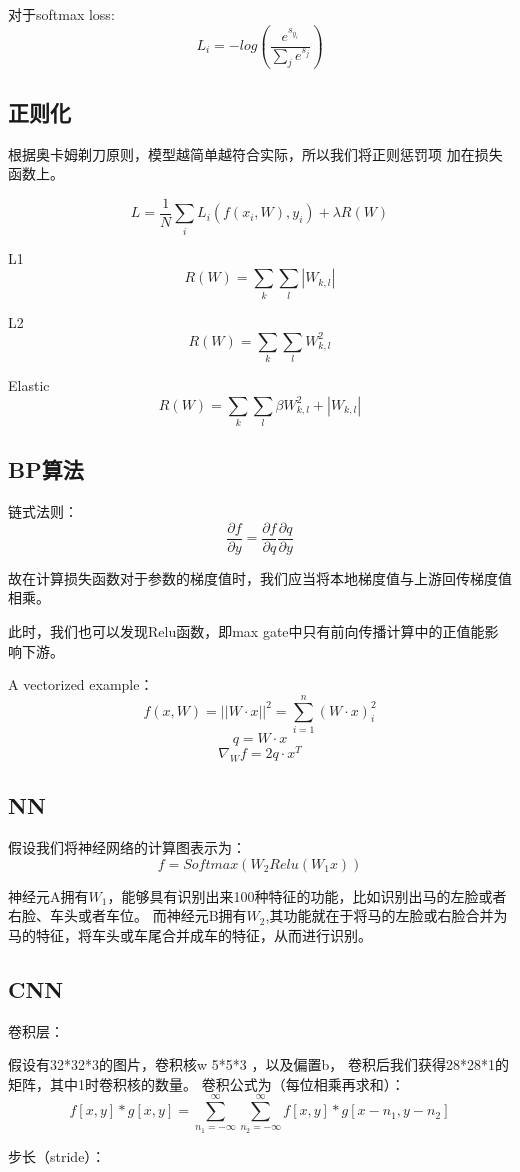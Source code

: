 \documentclass[a4paper]{article}
\begin{document}
对于softmax loss:
$$L_i = -log (\frac{e^{s_{y_i}}}{\sum_j e^{s_{j}}})$$

\subsection{正则化}

根据奥卡姆剃刀原则，模型越简单越符合实际，所以我们将正则惩罚项
加在损失函数上。

$$L =\frac{1}{N} \sum_i L_i(f(x_i,W),y_i)+λ R(W)$$

L1
$$R(W)=\sum_k \sum_l |W_{k,l}|$$

L2
$$R(W)=\sum_k \sum_l W_{k,l}^2$$

Elastic
$$R(W)=\sum_k \sum_l \beta W_{k,l}^2+|W_{k,l}|$$
\subsection{BP算法}
链式法则：
$$\frac{\partial f}{\partial y}=\frac{\partial f}{\partial q}\frac{\partial q}{\partial y}$$

故在计算损失函数对于参数的梯度值时，我们应当将本地梯度值与上游回传梯度值相乘。

此时，我们也可以发现Relu函数，即max gate中只有前向传播计算中的正值能影响下游。

A vectorized example：
$$f(x,W) =||W ⋅ x||^2 = \sum_{i=1}^n(W ⋅ x)_i^2$$
$$q = W \cdot x$$
$$\nabla_W f = 2q \cdot x^T$$


\subsection{NN}
假设我们将神经网络的计算图表示为：
$$f = Softmax(W_2 Relu(W_1 x))$$

神经元A拥有$W_1$，能够具有识别出来100种特征的功能，比如识别出马的左脸或者右脸、车头或者车位。
而神经元B拥有$W_2$,其功能就在于将马的左脸或右脸合并为马的特征，将车头或车尾合并成车的特征，从而进行识别。

\subsection{CNN}

卷积层：

假设有32*32*3的图片，卷积核w 5*5*3 ，以及偏置b，
卷积后我们获得28*28*1的矩阵，其中1时卷积核的数量。
卷积公式为（每位相乘再求和）：
$$
f[x,y] * g[x,y] = \sum_{n_1=-\infty}^{\infty } \sum_{n_2=-\infty}^{\infty } f[x,y] * g[x-n_1,y-n_2]
$$

步长（stride）：
\end{document}
